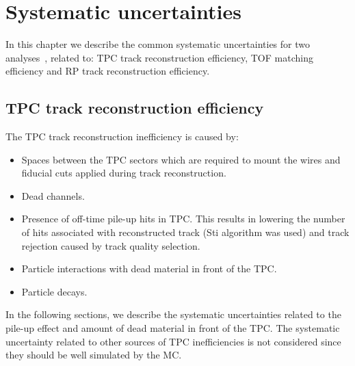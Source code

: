 

\chapter{Systematic uncertainties}\label{chap:systematicErrors}
In this chapter we describe the common systematic uncertainties for two analyses~\cite{AnalysisNoteRafal,AnalysisNoteLukasz}, related to: TPC track reconstruction efficiency, TOF matching efficiency and RP track reconstruction efficiency.
\section{TPC track reconstruction efficiency}\label{sec:tpcSystematics}
The TPC track reconstruction inefficiency is caused by:
\begin{itemize}
	\item Spaces  between  the TPC sectors which are required to mount the wires and fiducial cuts applied during  track reconstruction.\\[-17pt]
	\item Dead channels.\\[-17pt]
	\item Presence of off-time pile-up hits in TPC.  This results in lowering the number of hits associated with reconstructed track (Sti algorithm was used) and track rejection caused by track quality selection.\\[-17pt]
	\item Particle interactions with dead material in front of the TPC.\\[-17pt]
	\item Particle decays.	
\end{itemize}

In the following sections, we describe the systematic uncertainties related to the pile-up effect and amount of dead material in front of the TPC. The systematic uncertainty  related to other sources of TPC inefficiencies  is not considered  since they should be well simulated by the MC.
